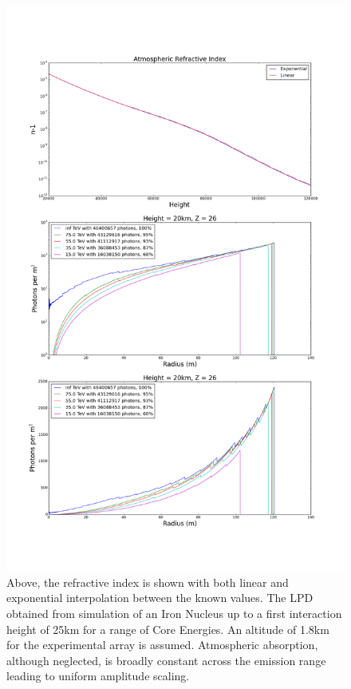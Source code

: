 \documentclass[11pt]{article}
\begin{document}
\begin{figure}
\begin{center}
\includegraphics[height=0.9\textheight]{simulatedlpd}
\caption{Above, the refractive index is shown with both linear and exponential interpolation between the known values. The LPD obtained from simulation of an Iron Nucleus up to a first interaction height of 25km for a range of Core Energies. An altitude of 1.8km for the experimental array is assumed. Atmospheric absorption, although neglected, is broadly constant across the emission range leading to uniform amplitude scaling.}
\label{fig:lpd}
\end{center}
\end{figure}
\end{document}
